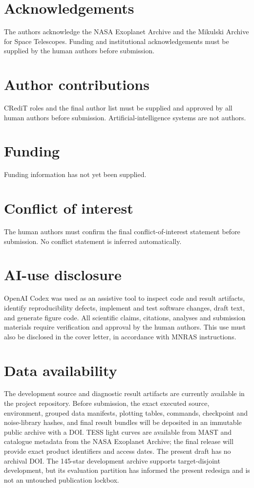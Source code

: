 \documentclass[fleqn,usenatbib]{mnras}
\begin{document}
\section*{Acknowledgements}

The authors acknowledge the NASA Exoplanet Archive and the Mikulski Archive for
Space Telescopes. Funding and institutional acknowledgements must be supplied by
the human authors before submission.

\section*{Author contributions}

CRediT roles and the final author list must be supplied and approved by all human
authors before submission. Artificial-intelligence systems are not authors.

\section*{Funding}

Funding information has not yet been supplied.

\section*{Conflict of interest}

The human authors must confirm the final conflict-of-interest statement before
submission. No conflict statement is inferred automatically.

\section*{AI-use disclosure}

OpenAI Codex was used as an assistive tool to inspect code and result artifacts,
identify reproducibility defects, implement and test software changes, draft
text, and generate figure code. All scientific claims, citations, analyses and
submission materials require verification and approval by the human authors.
This use must also be disclosed in the cover letter, in accordance with MNRAS
instructions.

\section*{Data availability}

The development source and diagnostic result artifacts are currently available
in the project repository. Before submission, the exact executed source,
environment, grouped data manifests, plotting tables, commands, checkpoint and
noise-library hashes, and final result bundles will be deposited in an immutable
public archive with a DOI. TESS light curves are available from MAST and catalogue
metadata from the NASA Exoplanet Archive; the final release will provide exact
product identifiers and access dates. The present draft has no archival DOI.
The 145-star development archive supports target-disjoint development, but its
evaluation partition has informed the present redesign and is not an untouched
publication lockbox.
\end{document}
